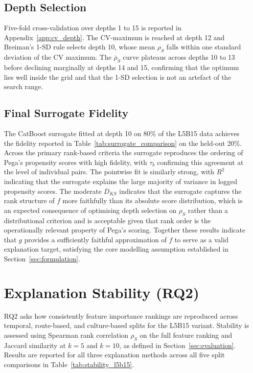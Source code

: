 \documentclass[oneside]{memoir} %
\begin{document}
\subsection{Depth Selection}

Five-fold cross-validation over depths 1 to 15 is reported in Appendix~\ref{app:cv_depth}. The CV-maximum is reached at depth 12 and Breiman's 1-SD rule selects depth 10, whose mean $\rho_S$ falls within one standard deviation of the CV maximum. The $\bar{\rho}_S$ curve plateaus across depths 10 to 13 before declining marginally at depths 14 and 15, confirming that the optimum lies well inside the grid and that the 1-SD selection is not an artefact of the search range.

\subsection{Final Surrogate Fidelity}

The CatBoost surrogate fitted at depth 10 on 80\% of the L5B15 data achieves the fidelity reported in Table~\ref{tab:surrogate_comparison} on the held-out 20\%. Across the primary rank-based criteria the surrogate reproduces the ordering of Pega's propensity scores with high fidelity, with $\tau_b$ confirming this agreement at the level of individual pairs. The pointwise fit is similarly strong, with $R^2$ indicating that the surrogate explains the large majority of variance in logged propensity scores. The moderate $D_{KS}$ indicates that the surrogate captures the rank structure of $f$ more faithfully than its absolute score distribution, which is an expected consequence of optimising depth selection on $\rho_S$ rather than a distributional criterion and is acceptable given that rank order is the operationally relevant property of Pega's scoring. Together these results indicate that $g$ provides a sufficiently faithful approximation of $f$ to serve as a valid explanation target, satisfying the core modelling assumption established in Section~\ref{sec:formulation}.

\section{Explanation Stability (RQ2)} \label{sec:rq2}

RQ2 asks how consistently feature importance rankings are reproduced across temporal, route-based, and culture-based splits for the L5B15 variant. Stability is assessed using Spearman rank correlation $\rho_S$ on the full feature ranking and Jaccard similarity at $k = 5$ and $k = 10$, as defined in Section~\ref{sec:evaluation}. Results are reported for all three explanation methods across all five split comparisons in Table~\ref{tab:stability_l5b15}.
\end{document}
